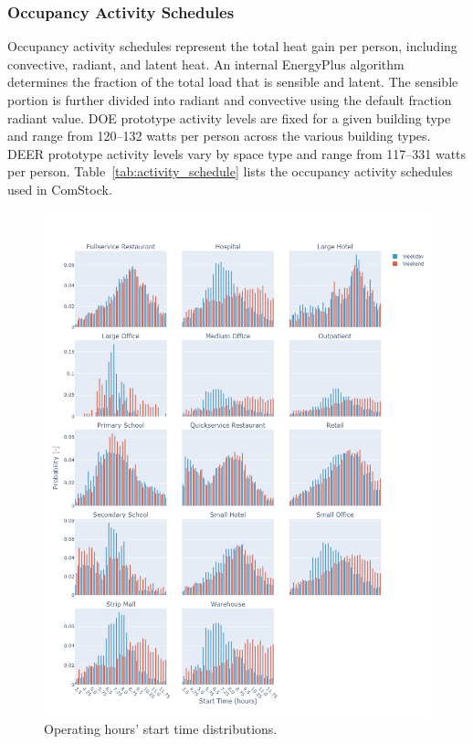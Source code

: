 \subsubsection{Occupancy Activity Schedules}
Occupancy activity schedules represent the total heat gain per person, including convective, radiant, and latent heat. An internal EnergyPlus algorithm determines the fraction of the total load that is sensible and latent. The sensible portion is further divided into radiant and convective using the default fraction radiant value. DOE prototype activity levels are fixed for a given building type and range from 120--132 watts per person across the various building types. DEER prototype activity levels vary by space type and range from 117--331 watts per person. Table~\ref{tab:activity_schedule} lists the occupancy activity schedules used in ComStock.

\pagebreak

\begin{figure}
   \centering \includegraphics[width=1\textwidth]{figures/start_time.png}
   \caption{Operating hours' start time distributions.}
    \label{fig:start_time}
\end{figure}

